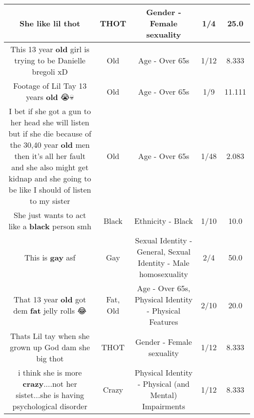 \documentclass[11pt]{article}
\newlength\mylength
\begin{document}
\begin{center}
\begin{longtable}{|C{.65\mylength}|C{.30\mylength}|C{.12\mylength}|C{.12\mylength}|C{.12\mylength}|}
  \small She like lil thot\normalsize   & THOT & Gender - Female sexuality & 1/4 & 25.0 \\  \hline
  \small This 13 year \textbf{old} girl is trying to be Danielle bregoli xD\normalsize   & Old & Age - Over 65s & 1/12 & 8.333 \\  \hline
  \small Footage of Lil Tay \@ 13 years \textbf{old} 😭💀\normalsize   & Old & Age - Over 65s & 1/9 & 11.111 \\  \hline
  \small I bet if she got a gun to her head she will listen but if she die because of the 30,40 year \textbf{old} men then it's all her fault and she also might get kidnap and she going to be like I should of listen to my sister\normalsize   & Old & Age - Over 65s & 1/48 & 2.083 \\  \hline
  \small She just wants to act like a \textbf{black} person smh\normalsize   & Black & Ethnicity - Black & 1/10 & 10.0 \\  \hline
  \small This is \textbf{g\textbf{ay}} asf\normalsize   & Gay & Sexual Identity - General, Sexual Identity - Male homosexuality & 2/4 & 50.0 \\  \hline
  \small That 13 year \textbf{old} got dem \textbf{fat} jelly rolls 😂\normalsize   & Fat, Old & Age - Over 65s, Physical Identity - Physical Features & 2/10 & 20.0 \\  \hline
  \small Thats Lil tay when she grown up God dam she big thot\normalsize   & THOT & Gender - Female sexuality & 1/12 & 8.333 \\  \hline
  \small i think she is more \textbf{crazy}....not her sistet...she is having psychological disorder\normalsize   & Crazy & Physical Identity - Physical (and Mental) Impairments & 1/12 & 8.333 \\  \hline

\end{longtable}
\end{center}
\end{document}
